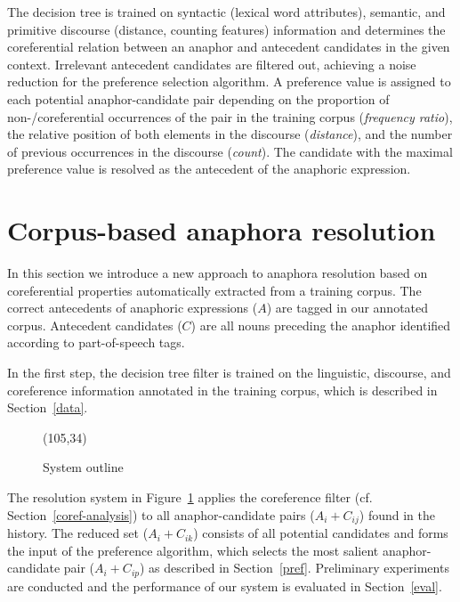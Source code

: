 The decision tree is trained on syntactic (lexical word attributes), semantic, and
primitive discourse (distance, counting features) information and determines the coreferential relation
between an anaphor and antecedent candidates in the given context. Irrelevant antecedent
candidates are filtered out, achieving a noise reduction for the preference selection
algorithm. A preference value is assigned to each potential anaphor-candidate pair depending
on the proportion of non-/coreferential occurrences of the pair in the training corpus
({\em frequency ratio}), the relative position of both elements in the discourse
({\em distance}), and the number of previous occurrences in the discourse ({\em count}).
The candidate with the maximal preference value is resolved as the antecedent of the anaphoric expression.

\section{Corpus-based anaphora resolution}
\label{res}

In this section we introduce a new approach to anaphora resolution based on 
coreferential properties automatically extracted from a training corpus.
The correct antecedents of anaphoric expressions ($A$) are tagged in our annotated corpus.
Antecedent candidates ($C$) are all nouns preceding the anaphor identified according to part-of-speech tags.

In the first step, the decision tree filter is trained on the linguistic, discourse, and coreference
information annotated in the training corpus, which is described in Section~\ref{data}.

\begin{figure}[htb]
  \vspace*{-1\baselineskip}
  \begin{center}

    \atari(105,34)

    \caption{System outline}\label{pic-outline}
  \vspace*{-0.5\baselineskip}
  \end{center}
\end{figure}

The resolution system in Figure~\ref{pic-outline} applies the coreference filter 
(cf. Section~\ref{coref-analysis}) to all anaphor-candidate pairs ($A_{i}+C_{ij}$) found in the history. 
The reduced set ($A_{i}+C_{ik}$) consists of all potential candidates and forms the input of the preference
algorithm, which selects the most salient anaphor-candidate pair ($A_{i}+C_{ip}$) as described in Section~\ref{pref}.
Preliminary experiments are conducted and the performance of our system is evaluated in Section~\ref{eval}. \\[-0.5em]

